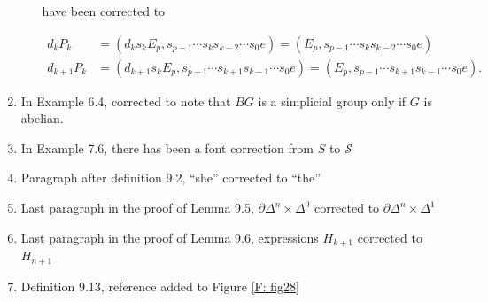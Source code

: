 \documentclass[12pt]{article}
\theoremstyle{plain}
\theoremstyle{definition}
\newcommand{\bd}{\partial}
\newcommand{\ms}[1]{\mathscr{#1}}
\begin{document}
\begin{enumerate}
\begin{enumerate}
have been corrected to

\begin{align*}
d_kP_k&=(d_ks_k E_p, s_{p-1}\cdots s_{k}s_{k-2} \cdots s_{0} e)=(E_p, s_{p-1}\cdots s_{k}s_{k-2} \cdots s_{0} e)\\
d_{k+1}P_k&=(d_{k+1}s_k E_p, s_{p-1}\cdots s_{k+1}s_{k-1} \cdots s_{0} e)=(E_p, s_{p-1}\cdots s_{k+1}s_{k-1} \cdots s_{0} e).
\end{align*}
\end{enumerate}


\item In Example 6.4, corrected to note that $BG$ is a simplicial group only if $G$ is abelian. 


\item In Example 7.6, there has been a font correction from $S$ to $\ms S$

\item Paragraph after definition 9.2, ``she'' corrected to ``the''

\item Last paragraph in the proof of Lemma 9.5, $\bd \Delta^n\times \Delta^0$ corrected to $\bd \Delta^n\times \Delta^1$

\item Last paragraph in the proof of Lemma 9.6, expressions $H_{k+1}$ corrected to $H_{n+1}$ 

\item Definition 9.13, reference added to Figure \ref{F: fig28}
\end{enumerate}
\end{document}
